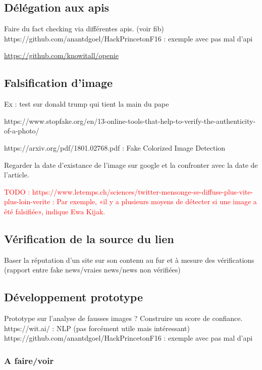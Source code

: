 \documentclass[12pt]{article}
\newcommand\todo[1]{\textcolor{red}{TODO : #1}}
\begin{document}




\subsection{Délégation aux apis}

Faire du fact checking via différentes apis. (voir fib)
https://github.com/anantdgoel/HackPrincetonF16 : exemple avec pas mal d'api

\url{https://github.com/knowitall/openie}

\subsection{Falsification d'image}

Ex : test sur donald trump qui tient la main du pape

https://www.stopfake.org/en/13-online-tools-that-help-to-verify-the-authenticity-of-a-photo/

https://arxiv.org/pdf/1801.02768.pdf : Fake Colorized Image Detection

Regarder la date d'existance de l'image sur google et la confronter avec la date de l'article.

\todo{https://www.letemps.ch/sciences/twitter-mensonge-se-diffuse-plus-vite-plus-loin-verite : Par exemple, «il y a plusieurs moyens de détecter si une image a été falsifiée», indique Ewa Kijak.}


\subsection{Vérification de la source du lien}

Baser la réputation d'un site sur son contenu au fur et à mesure des vérifications (rapport entre fake news/vraies news/news non vérifiées)

\subsection{Développement prototype}

Prototype sur l'analyse de fausses images ? 
Construire un score de confiance.
https://wit.ai/ : NLP (pas forcément utile mais intéressant)
https://github.com/anantdgoel/HackPrincetonF16 : exemple avec pas mal d'api

\subsubsection{A faire/voir}
\end{document}
